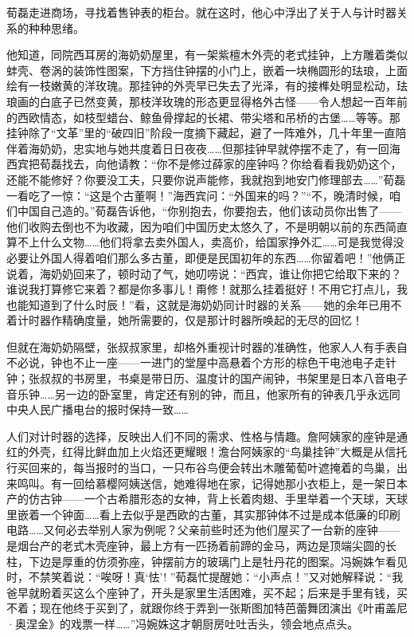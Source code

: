 \par 荀磊走进商场，寻找着售钟表的柜台。就在这时，他心中浮出了关于人与计时器关系的种种思绪。
\par 他知道，同院西耳房的海奶奶屋里，有一架紫檀木外壳的老式挂钟，上方雕着类似蚌壳、卷涡的装饰性图案，下方挡住钟摆的小门上，嵌着一块椭圆形的珐琅，上面绘有一枝嫩黄的洋玫瑰。那挂钟的外壳早已失去了光泽，有的接榫处明显松动，珐琅画的白底子已然变黄，那枝洋玫瑰的形态更显得格外古怪——令人想起一百年前的西欧情态，如枝型蜡台、鲸鱼骨撑起的长裙、带尖塔和吊桥的古堡……等等。那挂钟除了“文革”里的“破四旧”阶段一度摘下藏起，避了一阵难外，几十年里一直陪伴着海奶奶，忠实地与她共度着日日夜夜……但那挂钟早就停摆不走了，有一回海西宾把荀磊找去，向他请教：“你不是修过薛家的座钟吗？你给看看我奶奶这个，还能不能修好？你要没工夫，只要你说声能修，我就抱到地安门修理部去……”荀磊一看吃了一惊：“这是个古董啊！”海西宾问：“外国来的吗？”“不，晚清时候，咱们中国自己造的。”荀磊告诉他，“你别抱去，你要抱去，他们该动员你出售了——他们收购去倒也不为收藏，因为咱们中国历史太悠久了，不是明朝以前的东西简直算不上什么文物……他们将拿去卖外国人，卖高价，给国家挣外汇……可是我觉得没必要让外国人得着咱们那么多古董，即便是民国初年的东西……你留着吧！”他俩正说着，海奶奶回来了，顿时动了气，她叨唠说：“西宾，谁让你把它给取下来的？谁说我打算修它来着？都是你多事儿！甭修！就那么挂着挺好！不用它打点儿，我也能知道到了什么时辰！”看，这就是海奶奶同计时器的关系——她的余年已用不着计时器作精确度量，她所需要的，仅是那计时器所唤起的无尽的回忆！
\par 但就在海奶奶隔壁，张叔叔家里，却格外重视计时器的准确性，他家人人有手表自不必说，钟也不止一座——一进门的堂屋中高悬着个方形的棕色干电池电子走针钟；张叔叔的书房里，书桌是带日历、温度计的国产闹钟，书架里是日本八音电子音乐钟……另一边的卧室里，肯定还有别的钟，而且，他家所有的钟表几乎永远同中央人民广播电台的报时保持一致……
\par 人们对计时器的选择，反映出人们不同的需求、性格与情趣。詹阿姨家的座钟是通红的外壳，红得比鲜血加上火焰还更耀眼！澹台阿姨家的“鸟巢挂钟”大概是从信托行买回来的，每当报时的当口，一只布谷鸟便会转出木雕葡萄叶遮掩着的鸟巢，出来鸣叫。有一回给慕樱阿姨送信，她难得地在家，记得她那小衣柜上，是一架日本产的仿古钟——一个古希腊形态的女神，背上长着肉翅、手里举着一个天球，天球里嵌着一个钟面……看上去似乎是西欧的古董，其实那钟体不过是成本低廉的印刷电路……又何必去举别人家为例呢？父亲前些时还为他们屋买了一台新的座钟——是烟台产的老式木壳座钟，最上方有一匹扬着前蹄的金马，两边是顶端尖圆的长柱，下边是厚重的仿须弥座，钟摆前方的玻璃门上是牡丹花的图案。冯婉姝乍看见时，不禁笑着说：“唉呀！真‘怯’! ”荀磊忙提醒她：“小声点！”又对她解释说：“我爸早就盼着买这么个座钟了，开头是家里生活困难，买不起；后来是手里有钱，买不着；现在他终于买到了，就跟你终于弄到一张斯图加特芭蕾舞团演出《叶甫盖尼·奥涅金》的戏票一样……”冯婉姝这才朝厨房吐吐舌头，领会地点点头。
